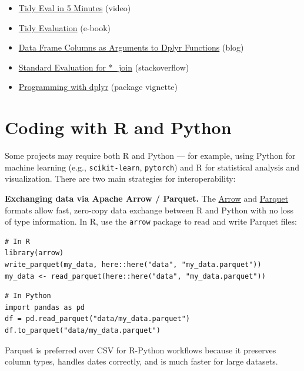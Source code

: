 \documentclass[
]{book}
\providecommand{\tightlist}{%
  \setlength{\itemsep}{0pt}\setlength{\parskip}{0pt}}
\begin{document}
\begin{itemize}
\tightlist
\item
  \href{https://www.youtube.com/watch?v=nERXS3ssntw}{Tidy Eval in 5 Minutes} (video)
\item
  \href{https://tidyeval.tidyverse.org/index.html}{Tidy Evaluation} (e-book)
\item
  \href{https://www.brodrigues.co/blog/2016-07-18-data-frame-columns-as-arguments-to-dplyr-functions/}{Data Frame Columns as Arguments to Dplyr Functions} (blog)
\item
  \href{https://stackoverflow.com/questions/28125816/r-standard-evaluation-for-join-dplyr}{Standard Evaluation for *\_join} (stackoverflow)
\item
  \href{https://dplyr.tidyverse.org/articles/programming.html}{Programming with dplyr} (package vignette)
\end{itemize}

\section{Coding with R and Python}\label{coding-with-r-and-python}

Some projects may require both R and Python --- for example, using Python for machine learning (e.g., \texttt{scikit-learn}, \texttt{pytorch}) and R for statistical analysis and visualization. There are two main strategies for interoperability:

\textbf{Exchanging data via Apache Arrow / Parquet.} The \href{https://arrow.apache.org/docs/r/}{Arrow} and \href{https://parquet.apache.org/}{Parquet} formats allow fast, zero-copy data exchange between R and Python with no loss of type information. In R, use the \texttt{arrow} package to read and write Parquet files:

\begin{verbatim}
# In R
library(arrow)
write_parquet(my_data, here::here("data", "my_data.parquet"))
my_data <- read_parquet(here::here("data", "my_data.parquet"))
\end{verbatim}

\begin{verbatim}
# In Python
import pandas as pd
df = pd.read_parquet("data/my_data.parquet")
df.to_parquet("data/my_data.parquet")
\end{verbatim}

Parquet is preferred over CSV for R-Python workflows because it preserves column types, handles dates correctly, and is much faster for large datasets.
\end{document}
